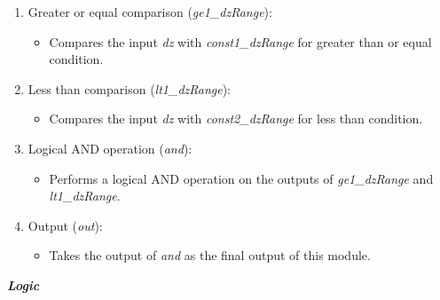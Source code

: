 \documentclass{article}
\begin{document}
\begin{enumerate}

\item Greater or equal comparison (\textit{ge1\_dzRange}):
\begin{itemize}
\item Compares the input \textit{dz} with \textit{const1\_dzRange} for greater than or equal condition.
\end{itemize}

\item Less than comparison (\textit{lt1\_dzRange}):
\begin{itemize}
\item Compares the input \textit{dz} with \textit{const2\_dzRange} for less than condition.
\end{itemize}

\item Logical AND operation (\textit{and}):
\begin{itemize}
\item Performs a logical AND operation on the outputs of \textit{ge1\_dzRange} and \textit{lt1\_dzRange}.
\end{itemize}

\item Output (\textit{out}):
\begin{itemize}
\item Takes the output of \textit{and} as the final output of this module.
\end{itemize}

\end{enumerate}

\vspace{0.5cm}

\textbf{\textit{Logic}}
\end{document}
